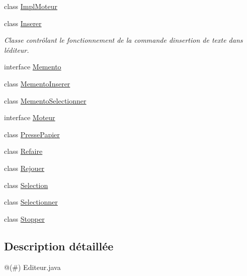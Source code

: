 \begin{DoxyCompactItemize}
class \hyperlink{classfr_1_1istic_1_1m1_1_1aco_1_1miniediteur_1_1v1_1_1ImplMoteur}{Impl\+Moteur}
\item 
class \hyperlink{classfr_1_1istic_1_1m1_1_1aco_1_1miniediteur_1_1v1_1_1Inserer}{Inserer}
\begin{DoxyCompactList}\small\item\em Classe contrôlant le fonctionnement de la commande d\textquotesingle{}insertion de texte dans l\textquotesingle{}éditeur. \end{DoxyCompactList}\item 
interface \hyperlink{interfacefr_1_1istic_1_1m1_1_1aco_1_1miniediteur_1_1v1_1_1Memento}{Memento}
\item 
class \hyperlink{classfr_1_1istic_1_1m1_1_1aco_1_1miniediteur_1_1v1_1_1MementoInserer}{Memento\+Inserer}
\item 
class \hyperlink{classfr_1_1istic_1_1m1_1_1aco_1_1miniediteur_1_1v1_1_1MementoSelectionner}{Memento\+Selectionner}
\item 
interface \hyperlink{interfacefr_1_1istic_1_1m1_1_1aco_1_1miniediteur_1_1v1_1_1Moteur}{Moteur}
\item 
class \hyperlink{classfr_1_1istic_1_1m1_1_1aco_1_1miniediteur_1_1v1_1_1PressePapier}{Presse\+Papier}
\item 
class \hyperlink{classfr_1_1istic_1_1m1_1_1aco_1_1miniediteur_1_1v1_1_1Refaire}{Refaire}
\item 
class \hyperlink{classfr_1_1istic_1_1m1_1_1aco_1_1miniediteur_1_1v1_1_1Rejouer}{Rejouer}
\item 
class \hyperlink{classfr_1_1istic_1_1m1_1_1aco_1_1miniediteur_1_1v1_1_1Selection}{Selection}
\item 
class \hyperlink{classfr_1_1istic_1_1m1_1_1aco_1_1miniediteur_1_1v1_1_1Selectionner}{Selectionner}
\item 
class \hyperlink{classfr_1_1istic_1_1m1_1_1aco_1_1miniediteur_1_1v1_1_1Stopper}{Stopper}
\end{DoxyCompactItemize}


\subsection{Description détaillée}
@(\#) Editeur.\+java 